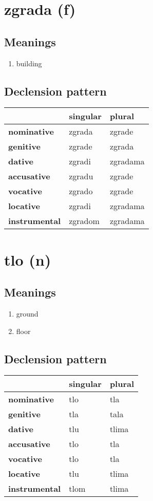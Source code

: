 \filbreak
\section{zgrada (f)}
\subsection*{Meanings}
\begin{enumerate}
\item building
\end{enumerate}
\subsection*{Declension pattern}
\begin{tabularx}{\linewidth}{Xll}
\toprule
{} & singular &    plural \\
\midrule
\textbf{nominative  } &   zgrada &    zgrade \\
\textbf{genitive    } &   zgrade &    zgrada \\
\textbf{dative      } &   zgradi &  zgradama \\
\textbf{accusative  } &   zgradu &    zgrade \\
\textbf{vocative    } &   zgrado &    zgrade \\
\textbf{locative    } &   zgradi &  zgradama \\
\textbf{instrumental} &  zgradom &  zgradama \\
\bottomrule
\end{tabularx}

\filbreak
\section{tlo (n)}
\subsection*{Meanings}
\begin{enumerate}
\item ground
\item floor
\end{enumerate}
\subsection*{Declension pattern}
\begin{tabularx}{\linewidth}{Xll}
\toprule
{} & singular & plural \\
\midrule
\textbf{nominative  } &      tlo &    tla \\
\textbf{genitive    } &      tla &   tala \\
\textbf{dative      } &      tlu &  tlima \\
\textbf{accusative  } &      tlo &    tla \\
\textbf{vocative    } &      tlo &    tla \\
\textbf{locative    } &      tlu &  tlima \\
\textbf{instrumental} &     tlom &  tlima \\
\bottomrule
\end{tabularx}

